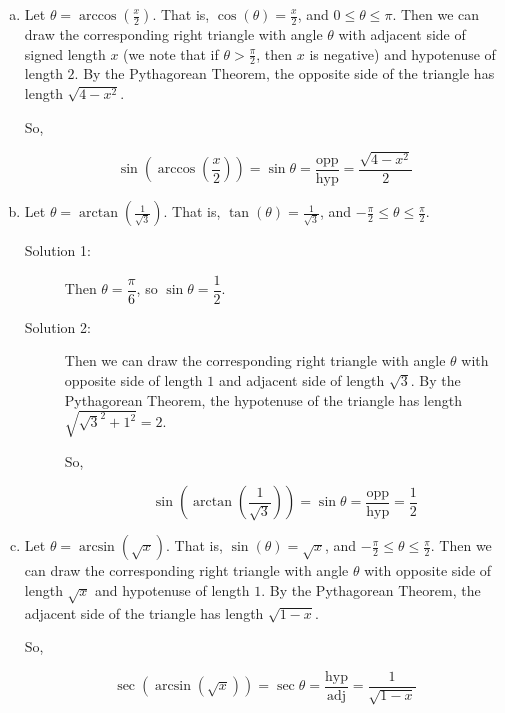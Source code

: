 \begin{solution}
\begin{enumerate}[(a)]
\item Let $\theta = \arccos \left(\frac{x}{2}\right)$. That is, $\cos(\theta) = \frac{x}{2}$, and $0 \leq \theta \leq \pi$. Then we can draw the corresponding right triangle with angle $\theta$ with adjacent side of signed length $x$ (we note that if $\theta > \frac{\pi}{2}$, then $x$ is negative) and hypotenuse of length $2$. By the Pythagorean Theorem, the opposite side of the triangle has length $\sqrt{4-x^2}$.
\begin{center}
\end{center}
So,

\[\sin\left(\arccos \left(\frac{x}{2}\right)\right)=\sin \theta = \frac{\mathrm{opp}}{\mathrm{hyp}} = \frac{\sqrt{4-x^2}}{2}\]


\item Let $\theta = \arctan \left(\frac{1}{\sqrt{3}}\right)$. That is, $\tan(\theta) = \frac{1}{\sqrt{3}}$, and $-\frac{\pi}{2} \leq \theta \leq \frac{\pi}{2}$.

\begin{description}
\item[Solution 1:] Then $\theta = \dfrac{\pi}{6}$, so $\sin\theta = \dfrac{1}{2}$.
\item[Solution 2:]
Then we can draw the corresponding right triangle with angle $\theta$ with opposite side of length $1$  and adjacent side of length $\sqrt{3}$. By the Pythagorean Theorem, the hypotenuse of the triangle has length $\sqrt{\sqrt{3}^2+1^2}=2$.
\begin{center}
\end{center}
So,

\[\sin\left(\arctan \left(\frac{1}{\sqrt{3}}\right)\right)=\sin \theta = \frac{\mathrm{opp}}{\mathrm{hyp}} = \frac{1}{2}\]
\end{description}

\item Let $\theta = \arcsin \left(\sqrt{x}\right)$. That is, $\sin(\theta) = \sqrt{x}$, and $-\frac{\pi}{2} \leq \theta \leq \frac{\pi}{2}$. Then we can draw the corresponding right triangle with angle $\theta$ with opposite side of length $\sqrt{x}$ and hypotenuse of length $1$. By the Pythagorean Theorem, the adjacent side of the triangle has length $\sqrt{1-x}$.
\begin{center}
\end{center}
So,

\[\sec\left(\arcsin \left(\sqrt{x}\right)\right)=\sec \theta = \frac{\mathrm{hyp}}{\mathrm{adj}} = \frac{1}{\sqrt{1-x}}\]

\end{enumerate}

\end{solution}




